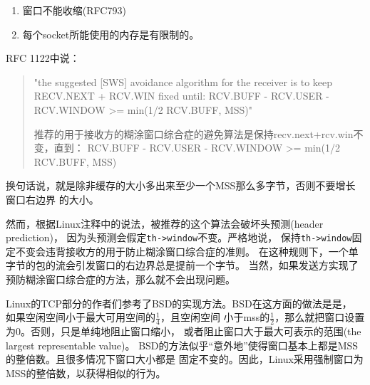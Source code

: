 \begin{enumerate}
  \item 窗口不能收缩(RFC793)
  \item 每个socket所能使用的内存是有限制的。
\end{enumerate}

RFC 1122中说：
\begin{quote}
"the suggested [SWS] avoidance algorithm for the receiver is to keep
RECV.NEXT + RCV.WIN fixed until:
RCV.BUFF - RCV.USER - RCV.WINDOW >= min(1/2 RCV.BUFF, MSS)"

推荐的用于接收方的糊涂窗口综合症的避免算法是保持recv.next+rcv.win不变，直到：
RCV.BUFF - RCV.USER - RCV.WINDOW >= min(1/2 RCV.BUFF, MSS)
\end{quote}

换句话说，就是除非缓存的大小多出来至少一个MSS那么多字节，否则不要增长窗口右边界
的大小。

然而，根据Linux注释中的说法，被推荐的这个算法会破坏头预测(header prediction)，
因为头预测会假定\texttt{th->window}不变。严格地说，
保持\texttt{th->window}固定不变会违背接收方的用于防止糊涂窗口综合症的准则。
在这种规则下，一个单字节的包的流会引发窗口的右边界总是提前一个字节。
当然，如果发送方实现了预防糊涂窗口综合症的方法，那么就不会出现问题。

Linux的TCP部分的作者们参考了BSD的实现方法。BSD在这方面的做法是是，
如果空闲空间小于最大可用空间的$\frac{1}{4}$，且空闲空间
小于mss的$\frac{1}{2}$，那么就把窗口设置为0。否则，只是单纯地阻止窗口缩小，
或者阻止窗口大于最大可表示的范围(the largest representable value)。
BSD的方法似乎“意外地”使得窗口基本上都是MSS的整倍数。且很多情况下窗口大小都是
固定不变的。因此，Linux采用强制窗口为MSS的整倍数，以获得相似的行为。


